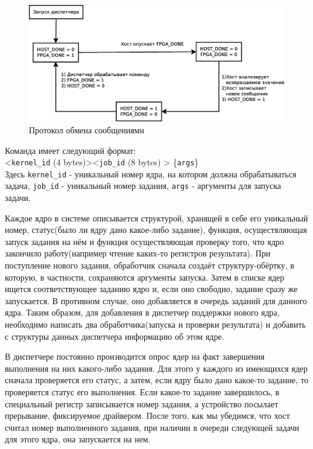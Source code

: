 \begin{figure}
\includegraphics [width=\textwidth]{pictures/mb_sch_auto}
\caption{Протокол обмена сообщениями}
\label{mb-sch-auto}
\end{figure}

Команда имеет следующий формат:\\
<\texttt {kernel\_id} (4 bytes)><\texttt {job\_id} (8 bytes) > \{\texttt{args}\} ~\\

Здесь \texttt {kernel\_id} - уникальный номер ядра, на котором должна
обрабатываться задача, \texttt{job\_id} - уникальный номер задания,
\texttt{args} - аргументы для запуска задачи.

Каждое ядро в системе описывается структурой, хранящей в себе его уникальный
номер, статус(было ли ядру дано какое-либо задание), функция, осуществляющая
запуск задания на нём и функция осуществляющая проверку того, что ядро
закончило работу(например чтение каких-то регистров результата). При
поступление нового задания, обработчик сначала создаёт структуру-обёртку, в
которую, в частности, сохраняются аргументы запуска. Затем в списке ядер ищется
соответствующее заданию ядро и, если оно свободно, задание сразу же
запускается. В противном случае, оно добавляется в очередь заданий для данного
ядра. Таким образом, для добавления в диспетчер поддержки нового ядра,
необходимо написать два обработчика(запуска и проверки результата) и добавить с
структуры данных диспетчера информацию об этом ядре.

В диспетчере постоянно производится опрос ядер на факт завершения выполнения
на них какого-либо задания. Для этого у каждого из имеющихся ядер сначала
проверяется его статус, а затем, если ядру было дано какое-то задание, то
проверяется статус его выполнения. Если какое-то задание завершилось,
в специальный регистр записывается номер задания, а устройство посылает
прерывание, фиксируемое драйвером.  После того, как мы убедимся, что хост считал
номер выполненного задания, при наличии в очереди следующей задачи для этого
ядра, она запускается на нем.

